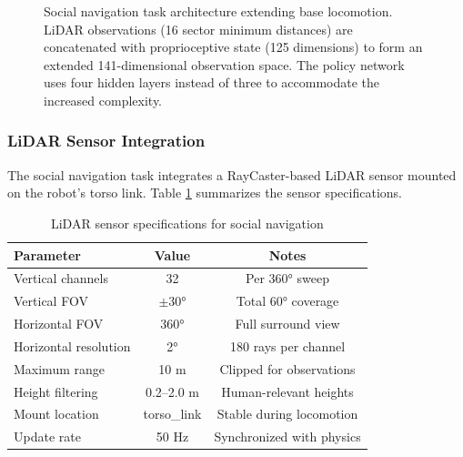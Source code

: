 \documentclass[12pt,a4paper]{article}
\begin{document}
\begin{figure}[htbp]
\caption[Social navigation architecture]{Social navigation task architecture extending base locomotion. LiDAR observations (16 sector minimum distances) are concatenated with proprioceptive state (125 dimensions) to form an extended 141-dimensional observation space. The policy network uses four hidden layers instead of three to accommodate the increased complexity.}
\label{fig:social_nav_architecture}
\end{figure}

\subsubsection{LiDAR Sensor Integration}

The social navigation task integrates a RayCaster-based LiDAR sensor mounted on the robot's torso link. Table \ref{tab:lidar_specs} summarizes the sensor specifications.

\begin{table}[htbp]
\centering
\caption{LiDAR sensor specifications for social navigation}
\label{tab:lidar_specs}
\begin{tabular}{lcc}
\toprule
\textbf{Parameter} & \textbf{Value} & \textbf{Notes} \\
\midrule
Vertical channels & 32 & Per 360° sweep \\
Vertical FOV & $\pm$30° & Total 60° coverage \\
Horizontal FOV & 360° & Full surround view \\
Horizontal resolution & 2° & 180 rays per channel \\
Maximum range & 10 m & Clipped for observations \\
Height filtering & 0.2--2.0 m & Human-relevant heights \\
Mount location & torso\_link & Stable during locomotion \\
Update rate & 50 Hz & Synchronized with physics \\
\bottomrule
\end{tabular}
\end{table}
\end{document}
